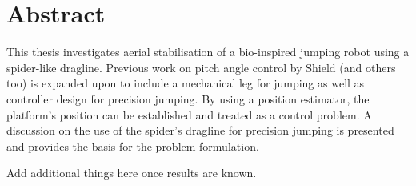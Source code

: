 \chapter*{Abstract}
This thesis investigates aerial stabilisation of a bio-inspired jumping robot using a spider-like dragline. Previous work on pitch angle control by Shield \cite{StaceyThesis} (and others too) is expanded upon to include a mechanical leg for jumping as well as controller design for precision jumping. By using a position estimator, the platform's position can be established and treated as a control problem. A discussion on the use of the spider's dragline for precision jumping is presented and provides the basis for the problem formulation. 

Add additional things here once results are known.